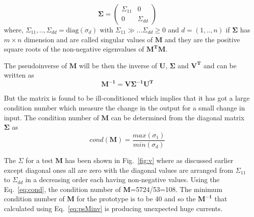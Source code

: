 \begin{equation*}
\bm{\Sigma} = \begin{pmatrix} 
\Sigma_{11} & 0 \\
0 & \Sigma_{dd} 
\end{pmatrix}
\end{equation*}
where, $\Sigma_{11},..,\Sigma_{dd}=\text{diag}(\sigma_d)$ with $\Sigma_{11}\gg... \Sigma_{dd}\geq0$ and $d=(1,..,n)$ if $\bm{\Sigma}$ has $m \times n$ dimension and are called singular values of $\bm{M}$  and they are the positive square roots of the non-negative eigenvalues of $\bm{M^T}\bm{M}$.

The pseudoinverse of $\bm{M}$ will be then the inverse of $\bm{U}$, $\bm{\Sigma}$ and $\bm{V^T}$ and can be written as
\begin{equation}\label{eq:psMinv}
    \bm{M^{-1}} = \bm{V \Sigma^{-1} U^T}
\end{equation}




But the matrix is found to be ill-conditioned which implies that it has got a large condition number which measure the change in the output for a small change in input. The condition number of $\bm{M}$ can be determined from the diagonal matrix $\bm{\Sigma}$ as 
 \begin{equation}\label{eq:cond}
     cond(\bm{M})=\frac{max(\sigma_1)}{min(\sigma_d)}
 \end{equation}
 

The $\Sigma$ for a test $\bm{M}$ has been shown in Fig.~\ref{fig:v} where as discussed earlier except diagonal ones all are zero with the diagonal values are arranged from $\Sigma_{11}$ to $\Sigma_{dd}$ in a decreasing order each having non-negative values. Using the Eq.~\ref{eq:cond}, the condition number of $\bm{M}$=5724/53=108. The minimum condition number of $\bm{M}$ for the prototype is to be 40 and so the $\bm{M^{-1}}$ that calculated using Eq.~\ref{eq:psMinv} is producing unexpected huge currents. 


\FloatBarrier

